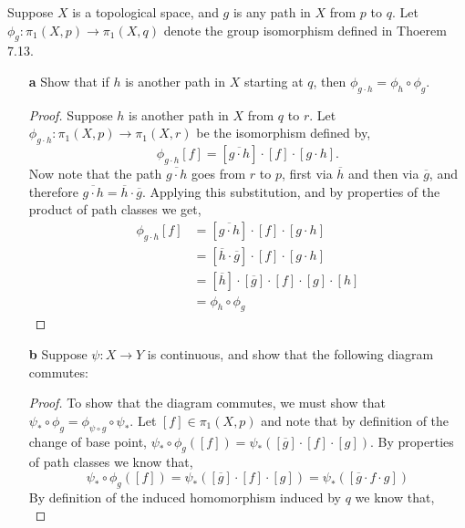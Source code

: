\documentclass{homework651}
\begin{document}
\begin{problems}
\problem Suppose $X$ is a topological space, and $g$ is any path in $X$ from $p$ to 
$q$. Let $\phi_g:\pi_1(X, p) \to \pi_1(X, q)$ denote the group isomorphism defined in Thoerem 7.13. 
\begin{enumerate}
    \item[\textbf{a}] Show that if $h$ is another path in $X$ starting at $q$, then $\phi_{g\cdot h}  = \phi_h \circ \phi_g$. 
    \begin{proof} Suppose $h$ is another path in $X$ from $q$ to $r$. Let $\phi_{g \cdot h}:\pi_1(X, p) \to \pi_1(X, r) $ be the isomorphism defined by, 
        \begin{equation*}
            \phi_{g \cdot h}[f] = [\overline{g \cdot h}]\cdot[f]\cdot[g \cdot h].
        \end{equation*}
        Now note that the path $\overline{g \cdot h}$ goes from $r$ to $p$, first via $\overline{h}$ and then via $\overline{g}$, and therefore $\overline{g \cdot h} = \overline{h} \cdot \overline{g}$. Applying this substitution, and by properties of the product of path classes we get, 
        \begin{align*}
            \phi_{g \cdot h}[f]  &= [\overline{g \cdot h}]\cdot[f]\cdot[g \cdot h]\\
            &=  [\overline{h}\cdot\overline{g}]\cdot[f]\cdot[g\cdot h]\\
            &=  [\overline{h}]\cdot [\overline{g}]\cdot[f]\cdot[g]\cdot[h]\\
            &=\phi_h \circ \phi_g
        \end{align*}   
    \end{proof}
    \item[\textbf{b}] Suppose $\psi: X \to Y$ is continuous, and show that the following diagram commutes:
    \begin{proof} To show that the diagram commutes, we must show that $\psi_* \circ \phi_{g} = \phi_{\psi \circ g} \circ \psi_*$. 
        Let $[f] \in \pi_1(X, p)$ and note that by definition of the change of base point, 
        $\psi_* \circ \phi_{g}([f]) =\psi_*([\overline{g}]\cdot[f]\cdot[g])$. By properties of path classes we know that, 
        \begin{equation*}
            \psi_* \circ \phi_{g}([f]) =\psi_*([\overline{g}]\cdot[f]\cdot[g]) = \psi_*([\overline{g} \cdot f\cdot g])
        \end{equation*}
        By definition of the induced homomorphism induced by $q$ we know that, 
        \begin{equation*}

\end{equation*}
\end{proof}
\end{enumerate}
\end{problems}
\end{document}
